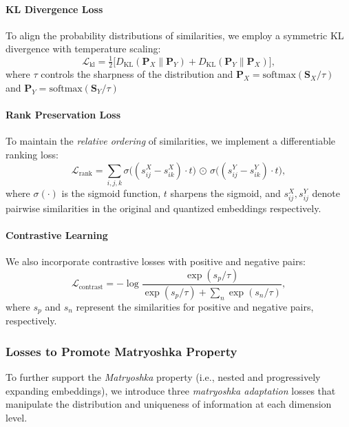 \paragraph{KL Divergence Loss}
To align the probability distributions of similarities, we employ a symmetric KL divergence with temperature scaling:
\begin{equation}
    \mathcal{L}_{\text{kl}} = \tfrac{1}{2}\bigl[D_{\text{KL}}(\mathbf{P}_X\|\mathbf{P}_Y) + D_{\text{KL}}(\mathbf{P}_Y\|\mathbf{P}_X)\bigr],
\end{equation}
where $\tau$ controls the sharpness of the distribution and $\mathbf{P}_X = \text{softmax}(\mathbf{S}_X/\tau)$ and $\mathbf{P}_Y = \text{softmax}(\mathbf{S}_Y/\tau)$

\paragraph{Rank Preservation Loss}
To maintain the \emph{relative ordering} of similarities, we implement a differentiable ranking loss:
\begin{equation}
    \mathcal{L}_{\text{rank}} = \sum_{i,j,k} \sigma \bigl((s_{ij}^X - s_{ik}^X)\cdot t\bigr) 
    \,\odot\, 
    \sigma \bigl((s_{ij}^Y - s_{ik}^Y)\cdot t\bigr),
\end{equation}
where $\sigma(\cdot)$ is the sigmoid function, $t$ sharpens the sigmoid, and $s_{ij}^X, s_{ij}^Y$ denote pairwise similarities in the original and quantized embeddings respectively.

\paragraph{Contrastive Learning}
We also incorporate contrastive losses with positive and negative pairs:
\begin{equation}
    \mathcal{L}_{\text{contrast}} = -\log\frac{\exp(s_p/\tau)}{\exp(s_p/\tau) + \sum_{n}\exp(s_n/\tau)},
\end{equation}
where $s_p$ and $s_n$ represent the similarities for positive and negative pairs, respectively.

\subsubsection{Losses to Promote Matryoshka Property}
\label{subsubsec:adv_info_control}
To further support the \emph{Matryoshka} property (i.e., nested and progressively expanding embeddings), we introduce three \emph{matryoshka adaptation} losses that manipulate the distribution and uniqueness of information at each dimension level.

